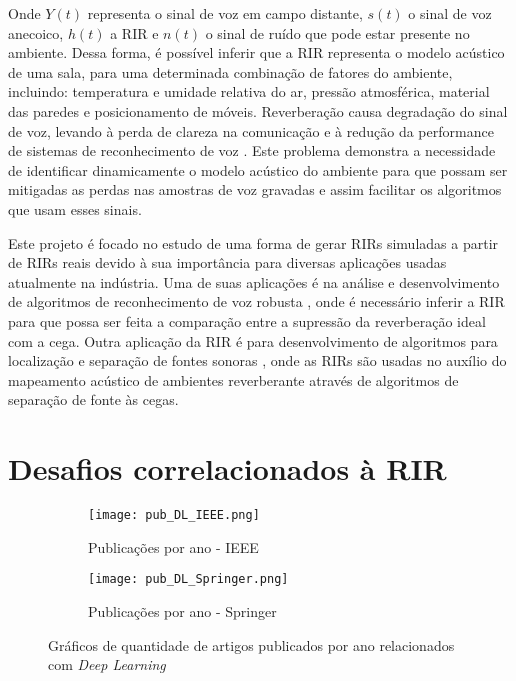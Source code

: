 Onde $Y(t)$ representa o sinal de voz em campo distante, $s(t)$ o sinal de voz anecoico, $h(t)$ a RIR e $n(t)$ o sinal de ruído que pode
estar presente no ambiente.
Dessa forma, é possível inferir que a RIR representa o modelo acústico de uma sala, para uma determinada combinação de fatores do ambiente, incluindo: 
temperatura e umidade relativa do ar, pressão atmosférica, material das paredes e posicionamento de móveis.
Reverberação causa degradação do sinal de voz, levando à perda de clareza na comunicação \cite{Speech_intellig_hear} e à redução da performance
de sistemas de reconhecimento de voz \cite{reverb_sup_speech_reg}. Este problema demonstra a necessidade de identificar dinamicamente o modelo acústico
do ambiente para que possam ser mitigadas as perdas nas amostras de voz gravadas e assim facilitar os algoritmos que usam esses sinais.

Este projeto é focado no estudo de uma forma de gerar RIRs simuladas a partir de RIRs reais devido à sua importância para diversas
aplicações usadas atualmente na indústria. Uma de suas aplicações é na análise e desenvolvimento de algoritmos de 
reconhecimento de voz robusta \cite{reverb_sup_speech_reg}, onde é necessário inferir a RIR para que possa ser feita a comparação entre
a supressão da reverberação ideal com a cega.
Outra aplicação da RIR é para desenvolvimento de algoritmos para localização e separação de fontes sonoras \cite{Source_sep_RIR},
onde as RIRs são usadas no auxílio do mapeamento acústico de ambientes reverberante através de algoritmos de separação de fonte às cegas.

\section{Desafios correlacionados à RIR}

\begin{figure} [H]
    \begin{subfigure}{1\textwidth}
        \centering
        \texttt{[image: pub\_DL\_IEEE.png]}
        \caption{Publicações por ano - IEEE}    
    \end{subfigure}
    \begin{subfigure}{1\textwidth}
        \centering
        \texttt{[image: pub\_DL\_Springer.png]}
        \caption{Publicações por ano - Springer\textregistered}    
    \end{subfigure}
    \caption{Gráficos de quantidade de artigos publicados por ano relacionados com \textit{Deep Learning}}
    \label{fig:pub_DL}
\end{figure}

